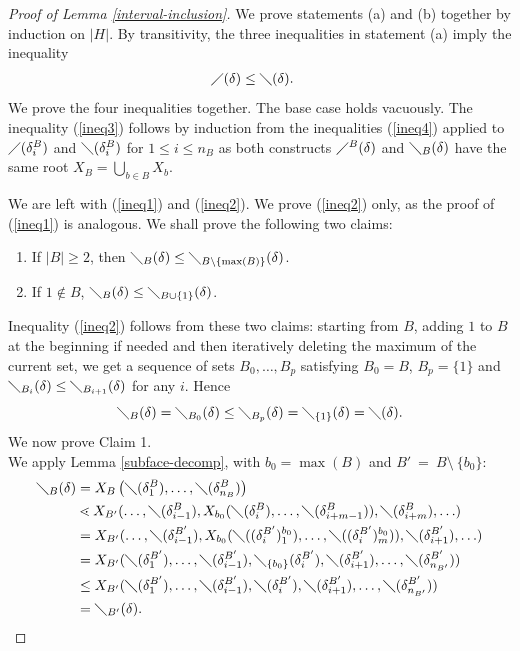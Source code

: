 \documentclass{article}
\theoremstyle{plain}
\theoremstyle{definition}
\newcommand{\set}[1]{\{#1\}}
\newcommand{\nin}{\not\in}
\begin{document}
\begin{proof} [Proof of Lemma \ref{interval-inclusion}]
We prove statements (a) and (b) together by induction on $|H|$. By transitivity, the three inequalities in statement (a) imply the inequality 
\begin{align}
 \diagup(\delta)&\leq \diagdown(\delta). \label{ineq4}
\end{align}
We prove the four inequalities together. The base case holds vacuously.
The inequality (\ref{ineq3}) follows by induction from the inequalities (\ref{ineq4}) applied to $\diagup(\delta^B_i)$ and $\diagdown(\delta^B_i)$ for $1\leq i \leq n_B$ as both constructs $\diagup^B(\delta)$ and $\diagdown_B(\delta)$ have the same root $X_B=\bigcup_{b \in B} X_b$.

We are left with (\ref{ineq1}) and (\ref{ineq2}). We prove (\ref{ineq2}) only, as the proof of (\ref{ineq1}) is analogous.
We shall prove the following two claims:
\begin{enumerate}
\item If $|B| \geq 2$, then $\diagdown_B(\delta) \leq \diagdown_{B \setminus\set{\max(B)}}(\delta)$.
\item If $1\nin B$, $
 \diagdown_B(\delta)
 \leq
 \diagdown_{B \cup\{1\}}(\delta)$.
\end{enumerate}
Inequality (\ref{ineq2}) follows from these two claims: starting from $B$, adding $1$ to $B$ at the beginning if needed and then iteratively deleting the maximum of the current set, we get a sequence of sets $B_0, \ldots, B_p$ satisfying $B_0=B$, $B_p=\{1\}$ and $\diagdown_{B_i}(\delta)
 \leq
 \diagdown_{B_{i+1}}(\delta)$ for any $i$. 
 Hence $$\diagdown_{B}(\delta)=\diagdown_{B_{0}}(\delta)\leq\diagdown_{B_{p}}(\delta)=
 \diagdown_{\set{1}}(\delta)= \diagdown(\delta).$$
We now prove Claim 1.\\
We apply Lemma \ref{subface-decomp}, with $b_0=\max(B)$ and $B'~=~B\setminus~\set{b_0}$:
\begin{align*}
 \diagdown_B(\delta) &= X_B \left(\diagdown(\delta^B_1), \ldots, \diagdown(\delta^B_{n_B}) \right) \\
&\lessdot X_{B'}(\ldots, \diagdown(\delta^B_{i-1}),X_{b_0}(\diagdown(\delta^B_i),\ldots,\diagdown(\delta^B_{i+m-1})),\diagdown(\delta^B_{i+m}),\ldots)\\
& = X_{B'}(\ldots, \diagdown(\delta^{B'}_{i-1}),X_{b_0}(\diagdown((\delta^{B'}_i)^{b_0}_1),\ldots,\diagdown((\delta^{B'}_i)^{b_0}_{m})),\diagdown(\delta^{B'}_{i+1}),\ldots)\\
&= X_{B'}(\diagdown( \delta^{B'}_1),\ldots, \diagdown(\delta^{B'}_{i-1}),\diagdown_{\set{b_0}}(\delta^{B'}_i),\diagdown(\delta^{B'}_{i+1}),\ldots,\diagdown(\delta^{B'}_{n_{B'}}))\\
&\leq X_{B'}(\diagdown( \delta^{B'}_1),\ldots, \diagdown(\delta^{B'}_{i-1}),\diagdown(\delta^{B'}_i),\diagdown(\delta^{B'}_{i+1}),\ldots,\diagdown(\delta^{B'}_{n_{B'}})) \\
&= \diagdown_{B'}(\delta).
\end{align*}


\end{proof}
\end{document}
